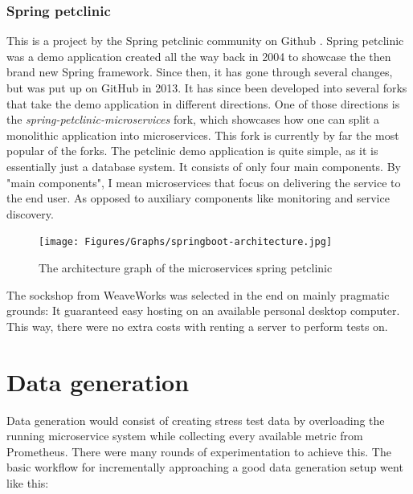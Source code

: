 \subsubsection*{Spring petclinic}
This is a project by the Spring petclinic community on Github \cite*{springboot}.
Spring petclinic was a demo application created all the way back in 2004 to showcase the then brand new Spring framework.
Since then, it has gone through several changes, but was put up on GitHub in 2013.
It has since been developed into several forks that take the demo application in different directions.
One of those directions is the \textit{spring-petclinic-microservices} fork, which showcases how one can split a monolithic application into microservices.
This fork is currently by far the most popular of the forks.
The petclinic demo application is quite simple, as it is essentially just a database system. It consists of only four main components.
By "main components", I mean microservices that focus on delivering the service to the end user. As opposed to auxiliary components like monitoring and service discovery.

\begin{figure}[ht]
    \centering
    \texttt{[image: Figures/Graphs/springboot-architecture.jpg]}
    \caption{The architecture graph of the microservices spring petclinic}
    \label{Spring-petclinic-microservices}
\end{figure}

The sockshop from WeaveWorks was selected in the end on mainly pragmatic grounds: It guaranteed easy hosting on an available personal desktop computer. This way, there were no extra costs with renting a server to perform tests on.

\section*{Data generation}
Data generation would consist of creating stress test data by overloading the running microservice system while collecting every available metric from Prometheus.
There were many rounds of experimentation to achieve this. The basic workflow for incrementally approaching a good data generation setup went like this:

